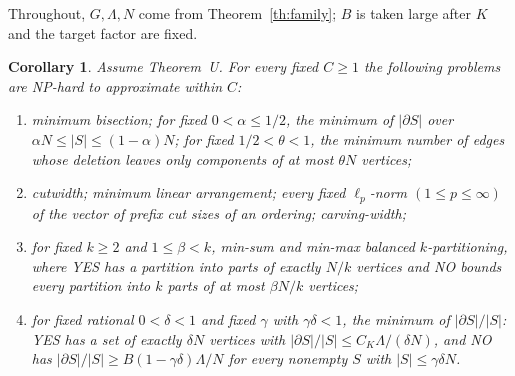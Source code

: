 \documentclass[11pt,letterpaper]{article}
\newtheorem{corollary}[theorem]{Corollary}
\theoremstyle{definition}
\theoremstyle{remark}
\begin{document}
Throughout, \(G,\Lambda,N\) come from Theorem~\ref{th:family}; \(B\) is
taken large after \(K\) and the target factor are fixed.

\begin{corollary}\label{cor:edge}
Assume Theorem~U. For every fixed \(C\ge1\) the following problems are
NP-hard to approximate within \(C\):
\begin{enumerate}[label=\textup{(\alph*)}]
\item minimum bisection; for fixed \(0<\alpha\le1/2\), the minimum of
\(|\partial S|\) over \(\alpha N\le|S|\le(1-\alpha)N\); for fixed
\(1/2<\theta<1\), the minimum number of edges whose deletion leaves only
components of at most \(\theta N\) vertices;
\item cutwidth; minimum linear arrangement; every fixed \(\ell_p\)-norm
\((1\le p\le\infty)\) of the vector of prefix cut sizes of an ordering;
carving-width;
\item for fixed \(k\ge2\) and \(1\le\beta<k\), min-sum and min-max
balanced \(k\)-partitioning, where YES has a partition into parts of exactly
\(N/k\) vertices and NO bounds every partition into \(k\) parts of at most
\(\beta N/k\) vertices;
\item for fixed rational \(0<\delta<1\) and fixed \(\gamma\) with
\(\gamma\delta<1\), the minimum of \(|\partial S|/|S|\): YES has a set of
exactly \(\delta N\) vertices with \(|\partial S|/|S|\le C_K\Lambda/(\delta
N)\), and NO has \(|\partial S|/|S|\ge B(1-\gamma\delta)\Lambda/N\) for
every nonempty \(S\) with \(|S|\le\gamma\delta N\).
\end{enumerate}
\end{corollary}
\end{document}
